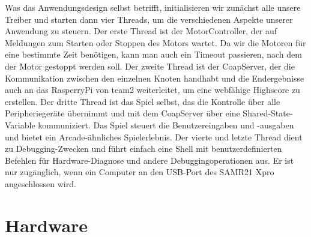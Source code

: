 \documentclass[a4paper]{article}
\begin{document}
Was das Anwendungsdesign selbst betrifft, initialisieren wir zunächst alle unsere Treiber und starten dann vier Threads, um die verschiedenen Aspekte unserer Anwendung zu steuern. Der erste Thread ist der MotorController, der auf Meldungen zum Starten oder Stoppen des Motors wartet. Da wir die Motoren für eine bestimmte Zeit benötigen, kann man auch ein Timeout passieren, nach dem der Motor gestoppt werden soll. Der zweite Thread ist der CoapServer, der die Kommunikation zwischen den einzelnen Knoten handhabt und die Endergebnisse auch an das RasperryPi von team2 weiterleitet, um eine webfähige Highscore zu erstellen. Der dritte Thread ist das Spiel selbst, das die Kontrolle über alle Peripheriegeräte übernimmt und mit dem CoapServer über eine Shared-State-Variable kommuniziert. Das Spiel steuert die Benutzereingaben und -ausgaben und bietet ein Arcade-ähnliches Spielerlebnis. Der vierte und letzte Thread dient zu Debugging-Zwecken und führt einfach eine Shell mit benutzerdefinierten Befehlen für Hardware-Diagnose und andere Debuggingoperationen aus. Er ist nur zugänglich, wenn ein Computer an den USB-Port des SAMR21 Xpro angeschlossen wird.

\section{Hardware}
\label{sec:hw}
\end{document}
